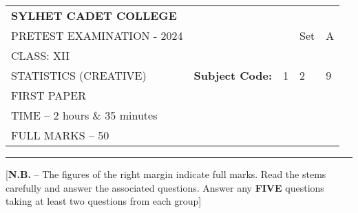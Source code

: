 \documentclass{article}
\begin{document}
\begin{table}[h]
\centering
\begin{tabular}{lllll}
\textbf{\large SYLHET CADET COLLEGE} &  &  &  &  \\ \cline{4-5} 
PRETEST EXAMINATION - 2024 &  & \multicolumn{1}{l|}{} & 
\multicolumn{1}{l|}{Set} & \multicolumn{1}{l|}{A} \\ \cline{4-5} 
CLASS: XII &  &  &  &  \\ \cline{3-5} 
STATISTICS (CREATIVE)& \multicolumn{1}{l|}{\textbf{Subject Code:}} & 
\multicolumn{1}{l|}{1} & \multicolumn{1}{l|}{2} & \multicolumn{1}{l|}{9} \\ \cline{3-5} 
 FIRST PAPER &  &  &  &  \\
TIME – 2 hours \& 35 minutes &  &  &  &  \\
FULL MARKS – 50 &  &  &  & 
\end{tabular}
\end{table}

\hrule

\begin{center}
[\textbf{N.B.} – The figures of the right margin indicate full marks. Read 
the stems carefully and answer the associated questions. Answer any
\textbf{FIVE} questions taking at least two questions from each group]\\
\end{center}
\end{document}
